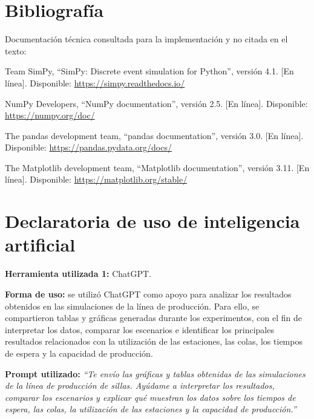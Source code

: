 \documentclass[conference,a4paper]{IEEEtran}
\begin{document}
\section*{Bibliografía}
{\footnotesize
Documentación técnica consultada para la implementación y no citada en el texto:

\begin{list}{}{\setlength{\leftmargin}{0.65cm}\setlength{\itemindent}{0pt}%
\setlength{\itemsep}{2pt}\setlength{\topsep}{2pt}\setlength{\parsep}{0pt}}
\item Team SimPy, ``SimPy: Discrete event simulation for Python'', versión 4.1. [En línea].
Disponible: \url{https://simpy.readthedocs.io/}
\item NumPy Developers, ``NumPy documentation'', versión 2.5. [En línea]. Disponible:
\url{https://numpy.org/doc/}
\item The pandas development team, ``pandas documentation'', versión 3.0. [En línea].
Disponible: \url{https://pandas.pydata.org/docs/}
\item The Matplotlib development team, ``Matplotlib documentation'', versión 3.11. [En
línea]. Disponible: \url{https://matplotlib.org/stable/}
\end{list}
}

\section*{Declaratoria de uso de inteligencia artificial}
\noindent\textbf{Herramienta utilizada 1:} ChatGPT.

\noindent\textbf{Forma de uso:} se utilizó ChatGPT como apoyo para analizar los resultados
obtenidos en las simulaciones de la línea de producción. Para ello, se compartieron tablas y
gráficas generadas durante los experimentos, con el fin de interpretar los datos, comparar los
escenarios e identificar los principales resultados relacionados con la utilización de las
estaciones, las colas, los tiempos de espera y la capacidad de producción.

\noindent\textbf{Prompt utilizado:} \textit{``Te envío las gráficas y tablas obtenidas de las
simulaciones de la línea de producción de sillas. Ayúdame a interpretar los resultados,
comparar los escenarios y explicar qué muestran los datos sobre los tiempos de espera, las
colas, la utilización de las estaciones y la capacidad de producción.''}
\end{document}
